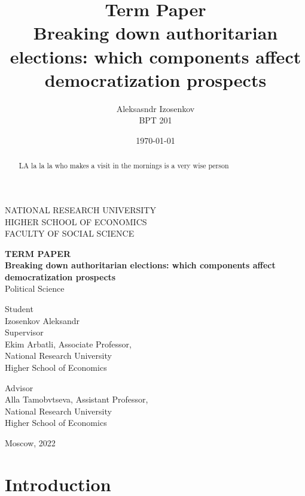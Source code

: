 \documentclass[a4paper, 11pt]{article}
\title{
Term Paper \\  Breaking down authoritarian elections: which components affect democratization prospects}
\author{Aleksasndr Izosenkov \\ BPT 201}
\date{\today}
\begin{document}
\doublespacing

\thispagestyle{empty} 

\begin{center}
NATIONAL RESEARCH UNIVERSITY
\\
HIGHER SCHOOL OF ECONOMICS
\\
FACULTY OF SOCIAL SCIENCE

\end{center}
\vspace{12ex}

\begin{center}
\textbf{TERM PAPER}\\
\vspace{2ex}
\textbf{Breaking down authoritarian elections: which components affect democratization prospects}\\
\vspace{2ex}
Political Science
\end{center}

\vspace{5ex}
\begin{flushright}
\hspace{40ex}
Student\\
Izosenkov Aleksandr \\

\vspace{5ex}
Supervisor\\
Ekim Arbatli, Associate Professor,\\ National Research University \\ Higher School of Economics

\vspace{5ex}
Advisor\\
Alla Tamobvtseva, Assistant Professor, \\National Research University\\ Higher School of Economics


\end{flushright}

\begin{center}
\vfill
Moscow, 2022
\end{center}

\newpage

\begin{abstract}
LA la la la who makes a visit in the mornings is a very wise person\end{abstract}

\section*{Introduction}
\end{document}
